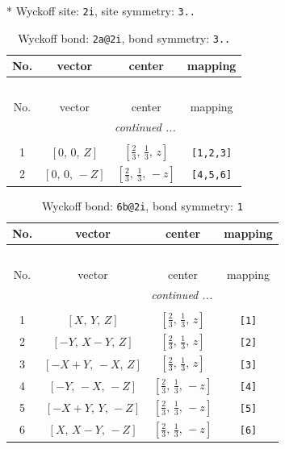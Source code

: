 \documentclass[fleqn,8pt]{jsarticle}
\begin{document}
* Wyckoff site: {\tt 2i}, site symmetry: {\tt 3..}
\renewcommand{\arraystretch}{1.2}
\begin{longtable}{cccc}
\caption{Wyckoff bond: {\tt 2a@2i}, bond symmetry: {\tt 3..}}
 \\
 \hline \hline
No. & vector & center & mapping \\ \hline \endfirsthead

\multicolumn{3}{l}{\tablename\ \thetable{}} \\
 \hline \hline
No. & vector & center & mapping \\ \hline \endhead

 \hline \hline
\multicolumn{3}{r}{\footnotesize\it continued ...} \\ \endfoot

 \hline \hline
\multicolumn{3}{r}{} \\ \endlastfoot

1 & $\left[ 0,\, 0,\, Z \right]$ & $\left[ \frac{2}{3},\, \frac{1}{3},\, z \right]$ & {\tt [1,2,3]} \\ \hline
2 & $\left[ 0,\, 0,\, - Z \right]$ & $\left[ \frac{2}{3},\, \frac{1}{3},\, - z \right]$ & {\tt [4,5,6]} \\
\end{longtable}
\renewcommand{\arraystretch}{1.2}
\begin{longtable}{cccc}
\caption{Wyckoff bond: {\tt 6b@2i}, bond symmetry: {\tt 1}}
 \\
 \hline \hline
No. & vector & center & mapping \\ \hline \endfirsthead

\multicolumn{3}{l}{\tablename\ \thetable{}} \\
 \hline \hline
No. & vector & center & mapping \\ \hline \endhead

 \hline \hline
\multicolumn{3}{r}{\footnotesize\it continued ...} \\ \endfoot

 \hline \hline
\multicolumn{3}{r}{} \\ \endlastfoot

1 & $\left[ X,\, Y,\, Z \right]$ & $\left[ \frac{2}{3},\, \frac{1}{3},\, z \right]$ & {\tt [1]} \\ \hline
2 & $\left[ - Y,\, X - Y,\, Z \right]$ & $\left[ \frac{2}{3},\, \frac{1}{3},\, z \right]$ & {\tt [2]} \\ \hline
3 & $\left[ - X + Y,\, - X,\, Z \right]$ & $\left[ \frac{2}{3},\, \frac{1}{3},\, z \right]$ & {\tt [3]} \\ \hline
4 & $\left[ - Y,\, - X,\, - Z \right]$ & $\left[ \frac{2}{3},\, \frac{1}{3},\, - z \right]$ & {\tt [4]} \\ \hline
5 & $\left[ - X + Y,\, Y,\, - Z \right]$ & $\left[ \frac{2}{3},\, \frac{1}{3},\, - z \right]$ & {\tt [5]} \\ \hline
6 & $\left[ X,\, X - Y,\, - Z \right]$ & $\left[ \frac{2}{3},\, \frac{1}{3},\, - z \right]$ & {\tt [6]} \\
\end{longtable}
\end{document}
